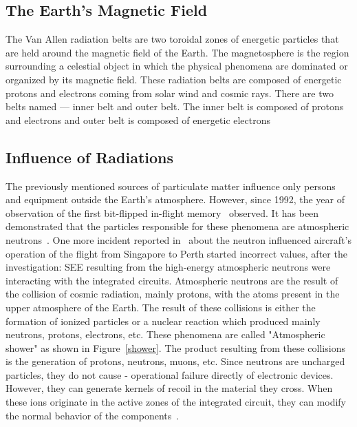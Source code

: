 \subsection{The Earth's Magnetic Field}

The Van Allen radiation belts are two toroidal zones of energetic particles that are held around the magnetic field of the Earth. The magnetosphere is the region surrounding a celestial object in which the
physical phenomena are dominated or organized by its magnetic field. These radiation belts are composed of energetic protons and electrons coming from solar wind and cosmic rays. There are two belts named --- inner belt and outer belt. The inner belt is composed of protons and electrons and outer belt is composed of energetic electrons~\citep{barth2003space}


\subsection{Influence of Radiations}
The previously mentioned sources of particulate matter influence only persons and equipment
outside the Earth's atmosphere. However, since 1992, the year of observation of the first
bit-flipped in-flight memory~\citep{taber1995investigation, taber1993single} observed. It has been demonstrated that the particles responsible for these
phenomena are atmospheric neutrons~\citep{leray2004atmospheric, jedec2006measurement}.
One more incident reported in~\cite{SWE20216} about the neutron influenced aircraft's operation of the flight from Singapore to Perth started incorrect values, after the investigation: SEE resulting from the high-energy atmospheric neutrons were interacting with the integrated circuits.
Atmospheric neutrons are the result of the collision of cosmic radiation,
mainly protons, with the atoms present in the upper atmosphere of the Earth. The result of these collisions is either the formation of ionized particles or a nuclear reaction which
produced mainly neutrons, protons, electrons, etc. These phenomena are called
"Atmospheric shower" as shown in Figure~\ref{shower}. The product resulting from these collisions is the generation of
protons, neutrons, muons, etc. Since neutrons are uncharged particles, they do not
cause  - operational failure directly of electronic devices. However, they can generate kernels of recoil in
the material they cross. When these ions originate in the active zones of the integrated circuit, they can modify the normal behavior of the components~\cite{normand1998extensions}.
%



